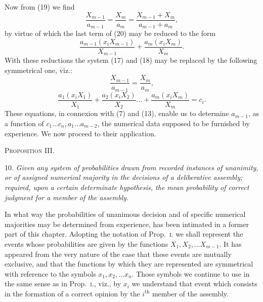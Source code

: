 \documentclass[oneside]{book}
\begin{document}
Now from (19) we find
\begin{equation*}
\frac{X_{m-1}}{a_{m-1}}=\frac{X_m}{a_m} = \frac{X_{m-1}+X_m}{a_{m-1}+a_m},
\end{equation*}
by virtue of which the last term of (20) may be reduced to the
form
\begin{equation*}
\frac{a_{m-1}(x_i X_{m-1})}{X_{m-1}}+\frac{a_m(x_i X_m)}{X_m}.
\end{equation*}
With these reductions the system (17) and (18) may be replaced
by the following symmetrical one, viz.:
\begin{equation}\tag{21}
\frac{X_{m-1}}{a_{m-1}}=\frac{X_m}{a_m},
\end{equation}
\begin{equation}\tag{22}
\frac{a_1(x_i X_1)}{X_1} +
\frac{a_2(x_i X_2)}{X_2}\dotsc +
\frac{a_m(x_i X_m)}{X_m} = c_i.
\end{equation}
These equations, in connexion with (7) and (13), enable us to
determine $a_{m-1}$, as a function of
$c_1 \dotsc c_n, a_1 \dotsc a_{m-2}$, the numerical
data supposed to be furnished by experience. We now proceed
to their application.

\begin{center}
\textsc{Proposition III}.
\end{center}

10. \emph{Given any system of probabilities drawn from recorded
instances of unanimity, or of assigned numerical majority in the
decisions of a deliberative assembly; required, upon a certain
determinate hypothesis, the mean probability of correct judgment for a
member of the assembly.}

In what way the probabilities of unanimous decision and of
specific numerical majorities may be determined from experience,
has been intimated in a former part of this chapter. Adopting
the notation of Prop.~\textsc{i}. we shall represent the events whose
probabilities are given by the functions $X_1,X_2, \dotsc X_{m-1}$. It has
appeared from the very nature of the case that these events are
mutually exclusive, and that the functions by which they are
represented are symmetrical with reference to the symbols $x_1, x_2, \dots x_n$.
Those symbols we continue to use in the same sense as in Prop.~\textsc{i}.,
viz., by $x_i$ we understand that event which consists in the
formation of a correct opinion by the $i^\text{th}$ member of the assembly.
\end{document}
